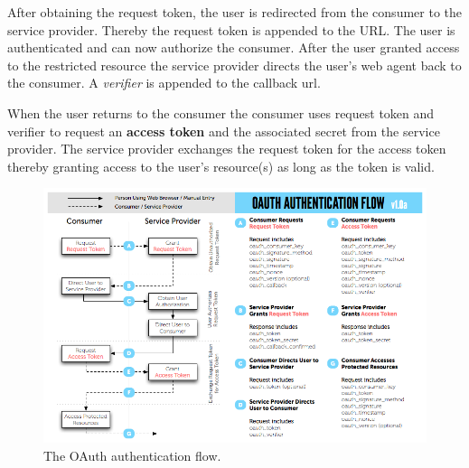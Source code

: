After obtaining the request token, the user is redirected from the
consumer to the service provider. Thereby the request token is
appended to the URL. The user is authenticated and can now
authorize the consumer. After the user granted access to the
restricted resource the service provider directs the user's web
agent back to the consumer. A \emph{verifier} is appended to the
callback url.

When the user returns to the consumer the consumer uses request
token and verifier to request an \textbf{access token} and the
associated secret from the service provider. The service provider
exchanges the request token for the access token thereby granting
access to the user's resource(s) as long as the token is valid.


\begin{figure}
	\label{pic:oauth-flow} 
	\centering
	\includegraphics[width=\textwidth]{../oauth_diagram.png}
	\caption{The OAuth authentication flow. \cite{oauth-flow-chart} } 
\end{figure}

